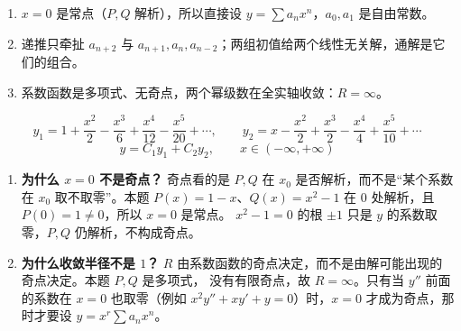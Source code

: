 ﻿\documentclass[11pt]{ctexart}
\begin{document}
\begin{enumerate}[label=\textcolor{violet}{\bfseries\arabic*.}]
\item $x=0$ 是常点（$P,Q$ 解析），所以直接设 $y=\sum a_nx^n$，$a_0,a_1$ 是自由常数。
\item 递推只牵扯 $a_{n+2}$ 与 $a_{n+1},a_n,a_{n-2}$；两组初值给两个线性无关解，通解是它们的组合。
\item 系数函数是多项式、无奇点，两个幂级数在全实轴收敛：$R=\infty$。
\end{enumerate}

\flowerrule

\[
y_1=1+\frac{x^2}{2}-\frac{x^3}{6}+\frac{x^4}{12}-\frac{x^5}{20}+\cdots,\qquad
y_2=x-\frac{x^2}{2}+\frac{x^3}{2}-\frac{x^4}{4}+\frac{x^5}{10}+\cdots
\]
\[
y=C_1y_1+C_2y_2,\qquad x\in(-\infty,+\infty)
\]

\begin{enumerate}[label=\textcolor{violet}{\bfseries\arabic*.}]
\item \textbf{为什么 $x=0$ 不是奇点？}\;
奇点看的是 $P,Q$ 在 $x_0$ 是否解析，而不是“某个系数在 $x_0$ 取不取零”。本题
$P(x)=1-x$、$Q(x)=x^2-1$ 在 $0$ 处解析，且 $P(0)=1\neq0$，所以 $x=0$ 是常点。
$x^2-1=0$ 的根 $\pm1$ 只是 $y$ 的系数取零，$P,Q$ 仍解析，不构成奇点。
\item \textbf{为什么收敛半径不是 $1$？}\;
$R$ 由系数函数的奇点决定，而不是由解可能出现的奇点决定。本题 $P,Q$ 是多项式，
没有有限奇点，故 $R=\infty$。只有当 $y''$ 前面的系数在 $x=0$ 也取零（例如
$x^2y''+xy'+y=0$）时，$x=0$ 才成为奇点，那时才要设 $y=x^r\sum a_nx^n$。
\end{enumerate}
\end{document}
